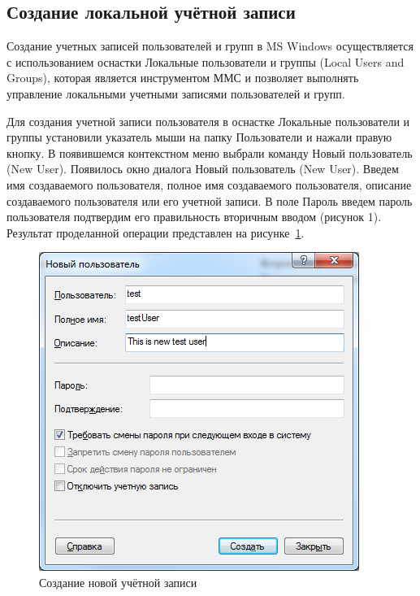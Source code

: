 \subsection{Создание локальной учётной записи}

Создание учетных записей пользователей и групп в MS Windows осуществляется
с использованием оснастки Локальные пользователи и группы (Local Users and Groups),
которая является инструментом ММС и позволяет выполнять управление локальными
учетными записями пользователей и групп.

Для создания учетной записи пользователя в оснастке Локальные пользователи и группы
установили указатель мыши на папку Пользователи и нажали правую кнопку.
В появившемся контекстном меню выбрали команду Новый пользователь (New User).
Появилось окно диалога Новый пользователь (New User).
Введем имя создаваемого пользователя, полное имя создаваемого пользователя,
описание создаваемого пользователя или его учетной записи.
В поле Пароль введем пароль пользователя подтвердим его правильность
вторичным вводом (рисунок 1). Результат проделанной операции представлен на
рисунке~\ref{pic:user_creation}.
\begin{figure} [h!]
  \centering
  \includegraphics[width=0.9\linewidth]{pic/user_creation}
  \caption{Создание новой учётной записи}
  \label{pic:user_creation}
\end{figure}

\newpage

